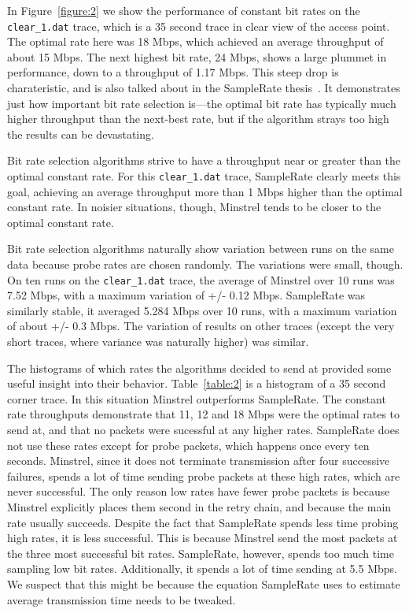 \documentclass[twocolumn,10pt]{article}
\begin{document}
In Figure~\ref{figure:2} we show the performance of constant bit rates
on the \texttt{clear\_1.dat} trace, which is a 35 second trace in
clear view of the access point.  The optimal rate here was 18 Mbps,
which achieved an average throughput of about 15 Mbps.  The next
highest bit rate, 24 Mbps, shows a large plummet in performance, down
to a throughput of 1.17 Mbps.  This steep drop is charateristic, and
is also talked about in the SampleRate thesis~\cite{samplerate}.  It
demonstrates just how important bit rate selection is---the optimal
bit rate has typically much higher throughput than the next-best rate,
but if the algorithm strays too high the results can be devastating.

Bit rate selection algorithms strive to have a throughput near or
greater than the optimal constant rate.  For this \verb|clear_1.dat|
trace, SampleRate clearly meets this goal, achieving an average
throughput more than 1 Mbps higher than the optimal constant rate.  In
noisier situations, though, Minstrel tends to be closer to the optimal
constant rate.

Bit rate selection algorithms naturally show variation between runs on
the same data because probe rates are chosen randomly.  The variations
were small, though.  On ten runs on the \texttt{clear\_1.dat} trace,
the average of Minstrel over 10 runs was 7.52 Mbps, with a maximum
variation of +/- 0.12 Mbps.  SampleRate was similarly stable, it
averaged 5.284 Mbps over 10 runs, with a maximum variation of about
+/- 0.3 Mbps.  The variation of results on other traces (except the
very short traces, where variance was naturally higher) was similar.

The histograms of which rates the algorithms decided to send at
provided some useful insight into their behavior.  Table~\ref{table:2}
is a histogram of a 35 second corner trace.  In this situation
Minstrel outperforms SampleRate.  The constant rate throughputs
demonstrate that 11, 12 and 18 Mbps were the optimal rates to send at,
and that no packets were sucessful at any higher rates.  SampleRate
does not use these rates except for probe packets, which happens once
every ten seconds.  Minstrel, since it does not terminate transmission
after four successive failures, spends a lot of time sending probe
packets at these high rates, which are never successful.  The only
reason low rates have fewer probe packets is because Minstrel
explicitly places them second in the retry chain, and because the main
rate usually succeeds.  Despite the fact that SampleRate spends less
time probing high rates, it is less successful.  This is because
Minstrel send the most packets at the three most successful bit rates.
SampleRate, however, spends too much time sampling low bit rates.
Additionally, it spends a lot of time sending at 5.5 Mbps.  We suspect
that this might be because the equation SampleRate uses to estimate
average transmission time needs to be tweaked.
\end{document}
